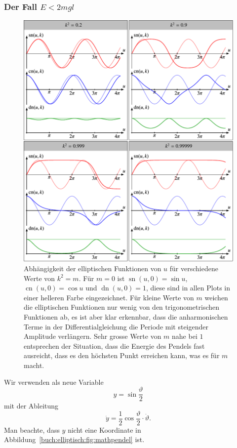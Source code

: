 \subsubsection{Der Fall $E<2mgl$}
\begin{figure}
\centering
\includegraphics[width=\textwidth]{chapters/110-elliptisch/images/jacobiplots.pdf}
\caption{%
Abhängigkeit der elliptischen Funktionen von $u$ für
verschiedene Werte von $k^2=m$.
Für $m=0$ ist $\operatorname{sn}(u,0)=\sin u$, 
$\operatorname{cn}(u,0)=\cos u$ und $\operatorname{dn}(u,0)=1$, diese
sind in allen Plots in einer helleren Farbe eingezeichnet.
Für kleine Werte von $m$ weichen die elliptischen Funktionen nur wenig
von den trigonometrischen Funktionen ab,
es ist aber klar erkennbar, dass die anharmonischen Terme in der
Differentialgleichung die Periode mit steigender Amplitude verlängern.
Sehr grosse Werte von $m$ nahe bei $1$ entsprechen der Situation, dass
die Energie des Pendels fast ausreicht, dass es den höchsten Punkt
erreichen kann, was es für $m$ macht.
\label{buch:elliptisch:fig:jacobiplots}}
\end{figure}


Wir verwenden als neue Variable 
\[
y = \sin\frac{\vartheta}2
\]
mit der Ableitung
\[
\dot{y}=\frac12\cos\frac{\vartheta}{2}\cdot \dot{\vartheta}.
\]
Man beachte, dass $y$ nicht eine Koordinate in
Abbildung~\ref{buch:elliptisch:fig:mathpendel} ist.

